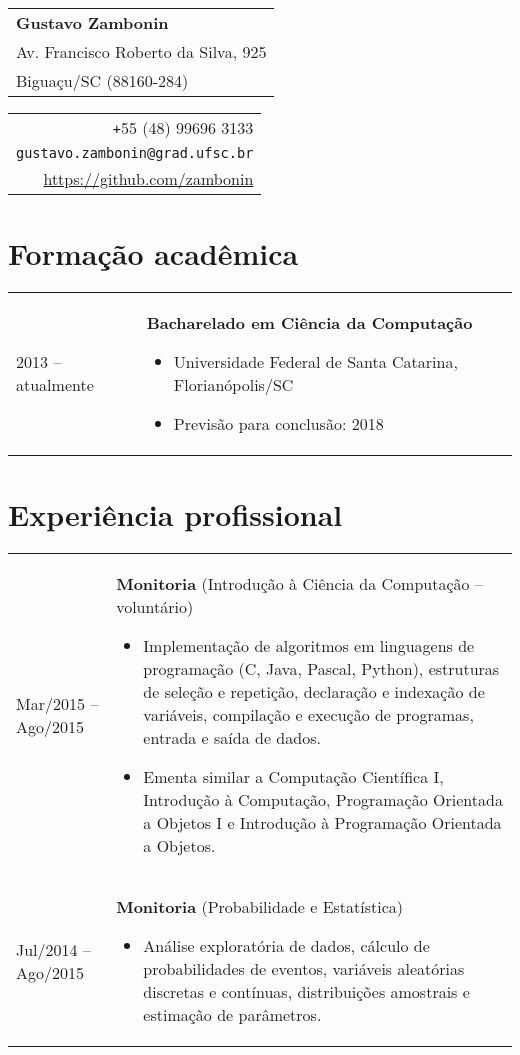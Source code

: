 \documentclass{article}
\newenvironment{contenttable}[1]{
    \section*{#1}
    \newcolumntype{L}{>{\bf \raggedleft}p{0.13\textwidth}}
    \newcolumntype{R}{p{0.82\textwidth}}
    \begin{tabular}{L!{\color{lightgray} \vrule}R}
}{
    \end{tabular}
}
\newenvironment{smallitem}{
    \vspace{-2mm}
    \begin{itemize}
    \setlength{\parskip}{0pt}
    \setlength{\itemsep}{2pt}
}{
    \vspace{-2mm}
    \end{itemize}
}
\begin{document}
\begin{tabular}{@{\hspace{-5mm}}l}
    {\Large \textbf{Gustavo Zambonin}} \\
    Av. Francisco Roberto da Silva, 925 \\
    Biguaçu/SC (88160-284)
\end{tabular}
\hfill
\begin{tabular}{r}
    \verb!+!55 (48) 99696 3133 \\
    \verb!gustavo.zambonin@grad.ufsc.br! \\
    \url{https://github.com/zambonin}
\end{tabular}

\begin{contenttable}{Formação acadêmica}
    2013 -- atualmente & \textbf{Bacharelado em Ciência da Computação}
    \begin{smallitem}
        \item Universidade Federal de Santa Catarina, Florianópolis/SC
        \item Previsão para conclusão: 2018
    \end{smallitem}
\end{contenttable}

\begin{contenttable}{Experiência profissional}
    Mar/2015 -- Ago/2015 & \textbf{Monitoria} (Introdução à Ciência da
        Computação -- voluntário)
    \begin{smallitem}
        \item Implementação de algoritmos em linguagens de programação (C,
        Java, Pascal, Python), estruturas de seleção e repetição, declaração e
        indexação de variáveis, compilação e execução de programas, entrada e
        saída de dados.
        \item Ementa similar a Computação Científica I, Introdução à
        Computação, Programação Orientada a Objetos I e Introdução à
        Programação Orientada a Objetos.
    \end{smallitem} \\

    Jul/2014 -- Ago/2015 & \textbf{Monitoria} (Probabilidade e Estatística)
    \begin{smallitem}
        \item Análise exploratória de dados, cálculo de probabilidades de
        eventos, variáveis aleatórias discretas e contínuas, distribuições
        amostrais e estimação de parâmetros.
    \end{smallitem}
\end{contenttable}
\end{document}
